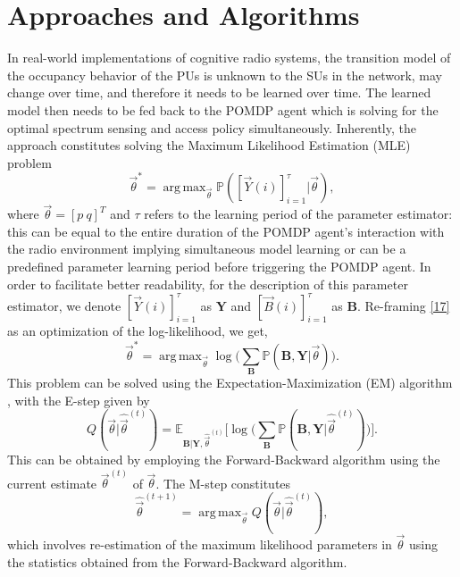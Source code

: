 \documentclass[10pt,twocolumn]{IEEEtran}
\DeclareMathOperator*{\argmax}{arg\,max}
\begin{document}
\section{Approaches and Algorithms}\label{III}
In real-world implementations of cognitive radio systems, the transition model of the occupancy behavior of the PUs is unknown to the SUs in the network, may change over time, and therefore it needs to be learned over time. The learned model then needs to be fed back to the POMDP agent which is solving for the optimal spectrum sensing and access policy simultaneously. Inherently, the approach constitutes solving the Maximum Likelihood Estimation (MLE) problem
\begin{equation}\label{17}
    \vec{\theta}^{*} = \argmax_{\vec{\theta}} \mathbb{P}([\vec{Y}(i)]_{i=1}^{\tau}|\vec{\theta}),
\end{equation}
where $\vec{\theta}{=}[p\ q]^{T}$ and $\tau$ refers to the learning period of the parameter estimator: this can be equal to the entire duration of the POMDP agent's interaction with the radio environment implying simultaneous model learning or can be a predefined parameter learning period before triggering the POMDP agent. In order to facilitate better readability, for the description of this parameter estimator, we denote $[\vec{Y}(i)]_{i=1}^{\tau}$ as $\mathbf{Y}$ and $[\vec{B}(i)]_{i=1}^{\tau}$ as $\mathbf{B}$. Re-framing \eqref{17} as an optimization of the log-likelihood, we get,
\begin{equation}\label{18}
    \vec{\theta}^{*} = \argmax_{\vec{\theta}} \log\Big(\sum_{\mathbf{B}} \mathbb{P}(\mathbf{B}, \mathbf{Y}| \vec{\theta})\Big).
\end{equation}
This problem can be solved using the Expectation-Maximization (EM) algorithm \cite{778361}, with the E-step given by
\begin{equation}
    Q(\vec{\theta}|\hat{\vec{\theta}}^{(t)}) = \mathbb{E}_{\mathbf{B}|\mathbf{Y}, \hat{\vec{\theta}}^{(t)}} \Big[ \log \Big(\sum_{\mathbf{B}} \mathbb{P}(\mathbf{B}, \mathbf{Y}|\hat{\vec{\theta}}^{(t)}) \Big) \Big].
\end{equation}
This can be obtained by employing the Forward-Backward algorithm \cite{778361} using the current estimate $\vec{\theta}^{(t)}$ of $\vec{\theta}$. The M-step constitutes
\begin{equation}
    \hat{\vec{\theta}}^{(t+1)} = \argmax_{\vec{\theta}} Q(\vec{\theta}|\hat{\vec{\theta}}^{(t)}),
\end{equation}
which involves re-estimation of the maximum likelihood parameters in $\vec{\theta}$ using the statistics obtained from the Forward-Backward algorithm.
\end{document}
